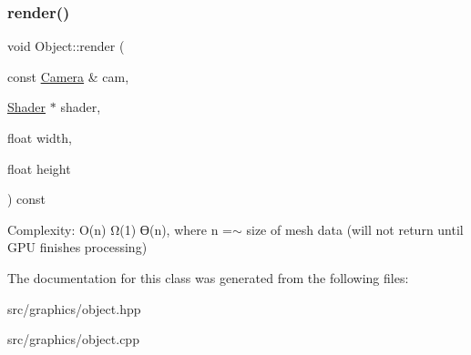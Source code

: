 \subsubsection{\texorpdfstring{render()}{render()}}
{\footnotesize\ttfamily void Object\+::render (\begin{DoxyParamCaption}\item[{const \mbox{\hyperlink{class_camera}{Camera}} \&}]{cam,  }\item[{\mbox{\hyperlink{class_shader}{Shader}} $\ast$}]{shader,  }\item[{float}]{width,  }\item[{float}]{height }\end{DoxyParamCaption}) const\hspace{0.3cm}{\ttfamily [virtual]}}

Complexity\+: O(n) Ω(1) ϴ(n), where n =$\sim$ size of mesh data (will not return until G\+PU finishes processing) 

The documentation for this class was generated from the following files\+:\begin{DoxyCompactItemize}
\item 
src/graphics/object.\+hpp\item 
src/graphics/object.\+cpp\end{DoxyCompactItemize}
